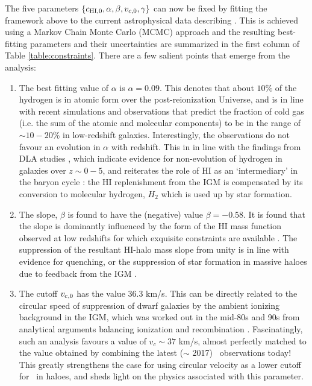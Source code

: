 The five parameters  $\{c_{\rm HI, 0}, \alpha, \beta, v_{c, 0}, \gamma\}$ can now be fixed by fitting the framework above to the current astrophysical data describing \HI.  This is achieved using a Markov Chain Monte Carlo (MCMC) approach \cite{hparaa2017}  and the resulting best-fitting parameters and their uncertainties are summarized in the first column of Table \ref{table:constraints}. There are a few salient points that emerge from the analysis:
\begin{enumerate}
    \item The best fitting value of $\alpha$ is $\alpha = 0.09$. This denotes that about $10\%$ of the hydrogen is in atomic form over the post-reionization Universe, and is in line with recent simulations and observations that predict the fraction of cold gas (i.e. the sum of the atomic and molecular components) to be in the range of $\sim 10-20$\% in low-redshift galaxies\cite{stern2016}. Interestingly, the observations do not favour an evolution in $\alpha$ with redshift. This in in line with the findings from DLA studies \cite{prochaska09}, which indicate evidence for non-evolution of hydrogen in galaxies over $z \sim 0-5$, and reiterates the role of HI as an `intermediary' in the baryon cycle \cite{wang2020, bouche2010, lilly2013, hploebsfr2020}: the HI replenishment from the IGM is compensated by its conversion to molecular hydrogen, $H_2$ which is used up by star formation.
    
    \item The slope, $\beta$ is found to have the (negative) value $\beta = -0.58$. It is found that the slope is dominantly influenced by the form of the HI mass function observed at low redshifts for which exquisite constraints are available \cite{zwaan05, martin10}. The suppression of the resultant HI-halo mass slope from unity is in line with evidence for quenching, or the suppression of star formation in massive haloes due to feedback from the IGM \cite{birnboim2007, finlator2017}.
    
    \item The cutoff $v_{\rm c,0}$ has the value 36.3 km/s. This can be directly related to the circular speed of suppression of dwarf galaxies by the ambient ionizing background in the IGM, which was worked out in the mid-80s and 90s from analytical arguments balancing ionization and recombination \cite{rees1986, efstathiou1992, quinn1996}. Fascinatingly, such an analysis favours a value of $v_c \sim 37$ km/s, almost perfectly matched to the value obtained by combining the latest ($\sim$ 2017)  \HI\ observations today! This greatly strengthens the case for using circular velocity as a lower cutoff for \HI\ in haloes, and sheds light on the physics associated with this parameter. 
    

\end{enumerate}
    



